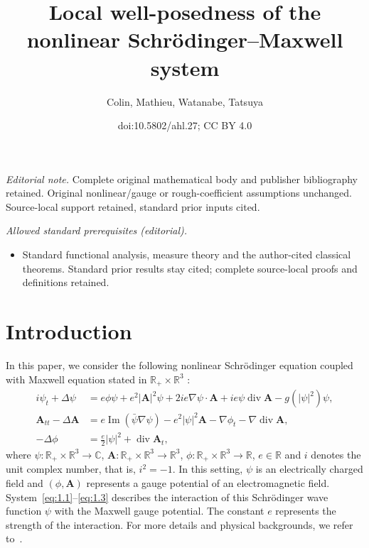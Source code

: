 \documentclass[10pt]{amsart}
\title{Local well-posedness of the nonlinear Schrödinger–Maxwell system}
\author{Colin, Mathieu, Watanabe, Tatsuya}
\date{doi:10.5802/ahl.27; CC BY 4.0}
\theoremstyle{definition}\newtheorem{defi}[theo]{Definition}\newtheorem{rema}[theo]{Remark}\newtheorem{exam}[theo]{Example}\newtheorem{exem}[theo]{Example}\newtheorem{nota}[theo]{Notation}
\newcommand{\BA}{\mathbf{A}}
\newcommand{\R}{\mathbb{R}}
\newcommand{\Com}{\mathbb{C}}
\DeclareMathOperator{\IM}{Im}
\DeclareMathOperator{\Div}{div}
\begin{document}
\maketitle
\noindent\textit{Editorial note.} Complete original mathematical body and publisher bibliography retained. Original nonlinear/gauge or rough-coefficient assumptions unchanged. Source-local support retained, standard prior inputs cited.\par\medskip
\noindent\textit{Allowed standard prerequisites (editorial).}\begin{itemize}
\item Standard functional analysis, measure theory and the author-cited classical theorems. Standard prior results stay cited; complete source-local proofs and definitions retained.
\end{itemize}\medskip

\section{Introduction}

In this paper, we consider the following nonlinear Schr\"odinger equation coupled with Maxwell equation stated in $\R_+\times \R^3$ :
\begin{align}
i \psi_t +\Delta \psi &= e \phi \psi +e^2 | \BA |^2 \psi +2ie \nabla \psi \cdot \BA +ie \psi \Div \BA - g(|\psi|^2)\psi, \label{eq:1.1}
\\
\BA_{tt}-\Delta \BA &= e \IM (\bar{\psi} \nabla \psi)-e^2|\psi|^2 \BA -
\nabla \phi_t - \nabla \Div \BA, \label{eq:1.2}
\\
-\Delta \phi &= \frac{e}{2} |\psi|^2 + \Div \BA_t, \label{eq:1.3}
\end{align}
where $\psi: \R_+\times \R^3 \to \Com$, $\BA: \R_+\times \R^3 \to \R^3$, $\phi: \R_+ \times \R^3 \to \R$, $e \in \R$ and $i$ denotes the unit complex number, that is, $i^2=-1$. In this setting, $\psi$ is an electrically charged field and $(\phi,\BA)$ represents a gauge potential of an electromagnetic field. System~\eqref{eq:1.1}--\eqref{eq:1.3} describes the interaction of this Schr\"odinger wave function $\psi$ with the Maxwell gauge potential. The constant $e$ represents the strength of the interaction. For more details and physical backgrounds, we refer to~\cite{F}.
\end{document}
